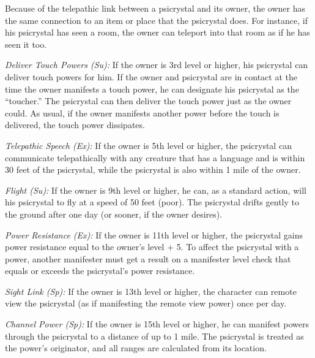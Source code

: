Because of the telepathic link between a psicrystal and its owner, the owner has the same connection to an item or place that the psicrystal does. For instance, if his psicrystal has seen a room, the owner can teleport into that room as if he has seen it too.

\textit{Deliver Touch Powers (Su):} If the owner is 3rd level or higher, his psicrystal can deliver touch powers for him. If the owner and psicrystal are in contact at the time the owner manifests a touch power, he can designate his psicrystal as the “toucher.” The psicrystal can then deliver the touch power just as the owner could. As usual, if the owner manifests another power before the touch is delivered, the touch power dissipates.

\textit{Telepathic Speech (Ex):} If the owner is 5th level or higher, the psicrystal can communicate telepathically with any creature that has a language and is within 30 feet of the psicrystal, while the psicrystal is also within 1 mile of the owner.

\textit{Flight (Su):} If the owner is 9th level or higher, he can, as a standard action, will his psicrystal to fly at a speed of 50 feet (poor). The psicrystal drifts gently to the ground after one day (or sooner, if the owner desires).

\textit{Power Resistance (Ex):} If the owner is 11th level or higher, the psicrystal gains power resistance equal to the owner’s level + 5. To affect the psicrystal with a power, another manifester must get a result on a manifester level check that equals or exceeds the psicrystal’s power resistance.

\textit{Sight Link (Sp):} If the owner is 13th level or higher, the character can remote view the psicrystal (as if manifesting the remote view power) once per day.

\textit{Channel Power (Sp):} If the owner is 15th level or higher, he can manifest powers through the psicrystal to a distance of up to 1 mile. The psicrystal is treated as the power’s originator, and all ranges are calculated from its location.

